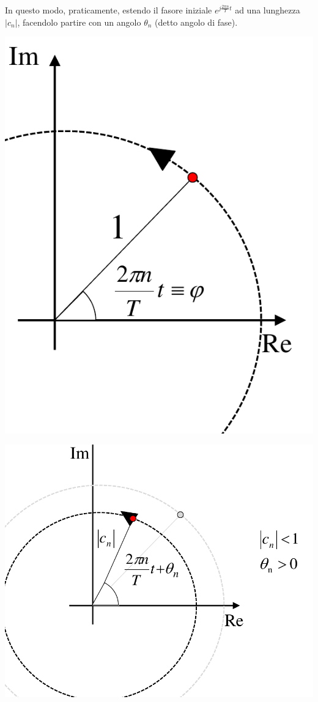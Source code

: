 \documentclass[a4paper, 10pt]{report}
\begin{document}
\noindent In questo modo, praticamente, estendo il fasore iniziale $e^{j\frac{2 \pi n}{T} t}$ ad una lunghezza $|c_n|$, facendolo partire con un angolo $\theta_n$ (detto angolo di fase). 
\begin{center}
\includegraphics[scale=0.6]{2.pdf}

\includegraphics[scale=0.6]{3.pdf}
\end{center}
\end{document}
